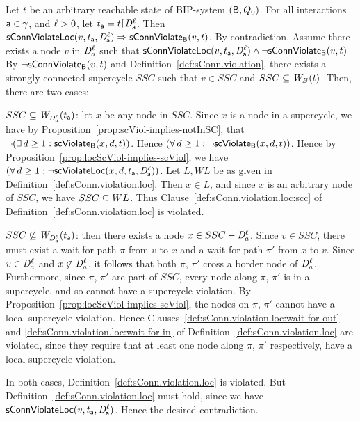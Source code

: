 \bp
\label{prop:locConnViol-implies-ConnViol}
 \label{prop:locConnViol-implies-connViol}
Let $t$ be an arbitrary reachable state of BIP-system $(\mathsf{B}, Q_0)$.
For all interactions $\mathsf{a} \in \gamma$, and $\ell > 0$, let $t_\act = t \pj \dsk{\act}{\l}$.
Then\\
\ind $\mathsf{sConnViolateLoc}(v,t_{\mathsf{a}},\mathit{D}_{\mathsf{a}}^{\ell}) \Rightarrow \mathsf{sConnViolate}_{\mathsf{B}}(v,t)$.
\ep
%
\bpr
By contradiction. Assume there exists a node $v$ in $\mathit{D}_{a}^{\ell}$ such that $\mathsf{sConnViolateLoc}(v,t_{\mathsf{a}},\mathit{D}_{\mathsf{a}}^{\ell}) \land \neg \mathsf{sConnViolate}_{\mathsf{B}}(v,t)$.
By $\neg \mathsf{sConnViolate}_{\mathsf{B}}(v,t)$ and Definition~\ref{def:sConn.violation}, there exists a strongly connected
supercycle $SSC$ such that $v \in SSC$ and $SSC \subseteq \mathit{W}_{B}({t})$. Then, there are two cases:
%
\bn
\item $SSC \subseteq \mathit{W}_{\mathit{D}_{a}^{\ell}}({t_{\mathsf{a}}})$: let $x$ be any node in $SSC$. Since $x$ is a node in a supercycle, we have by
  Proposition~\ref{prop:scViol-implies-notInSC}, that $\neg (\exists\, d \ge 1: \mathsf{scViolate}_{\mathsf{B}}(x,d,t))$. Hence 
  $(\forall\, d \ge 1: \neg \mathsf{scViolate}_{\mathsf{B}}(x,d,t))$. Hence by Proposition~\ref{prop:locScViol-implies-scViol}, 
  we have $(\forall\, d \ge 1: \neg \mathsf{scViolateLoc}(x,d,t_{\mathsf{a}},\mathit{D}_{\mathsf{a}}^{\ell}))$. Let $L, WL$ be as given in Definition~\ref{def:sConn.violation.loc}.
  Then $x \in L$, and since $x$ is an arbitrary node of $SSC$, we have $SSC \subseteq WL$. 
  Thus Clause~\ref{def:sConn.violation.loc:scc} of Definition~\ref{def:sConn.violation.loc} is violated.

\item $SSC \not\subseteq \mathit{W}_{\mathit{D}_{a}^{\ell}}({t_{\mathsf{a}}})$: then there exists a node $x \in SSC -
  \mathit{D}_{a}^{\ell}$. Since $v \in SSC$, there must exist a wait-for path $\pi$
  from $v$ to $x$ and a wait-for path $\pi'$ from $x$ to
  $v$. Since $v \in \mathit{D}_{a}^{\ell}$ and $x \not\in \mathit{D}_{a}^{\ell}$, it
  follows that both $\pi$, $\pi'$  cross a border node of
  $\mathit{D}_{a}^{\ell}$. Furthermore, since $\pi$, $\pi'$ are part of $SSC$, every node
  along $\pi$, $\pi'$ is in a supercycle, and so cannot have a supercycle violation.
  By Proposition~\ref{prop:locScViol-implies-scViol}, the nodes on
  $\pi$, $\pi'$  cannot have a local supercycle violation.
  Hence Clauses~\ref{def:sConn.violation.loc:wait-for-out} and
  \ref{def:sConn.violation.loc:wait-for-in} of Definition~\ref{def:sConn.violation.loc} are violated,
  since they require that at least one node along $\pi$, $\pi'$ respectively, have a local supercycle violation.
  
\en
In both cases,  Definition~\ref{def:sConn.violation.loc} is violated. 
But  Definition~\ref{def:sConn.violation.loc} must hold, since we have $\mathsf{sConnViolateLoc}(v,t_{\mathsf{a}},\mathit{D}_{\mathsf{a}}^{\ell})$. 
Hence the desired contradiction.
\epr


